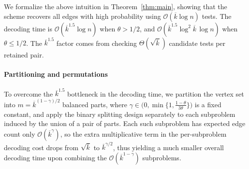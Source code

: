 \documentclass[journal]{IEEEtran}
\theoremstyle{definition}
\theoremstyle{definition}
\newcommand{\kb}{\overline{k}}
\newcommand{\bigO}{\mathcal{O}}
\begin{document}
We formalize the above intuition in Theorem~\ref{thm:main}, showing that the scheme recovers all edges with high probability using \(\bigO(\kb\log n)\) tests. The decoding time is \(\bigO(\kb^{1.5}\log n)\) when \(\theta>1/2\), and \(\bigO(\kb^{1.5}\log^{2}\kb\,\log n)\) when \(\theta\le 1/2\). The \(\kb^{1.5}\) factor comes from checking \(\Theta(\sqrt{\kb})\) candidate tests per retained pair.


\paragraph{Partitioning and permutations}
To overcome the \(\kb^{1.5}\) bottleneck in the decoding time, we partition the vertex set into
\(m=\kb^{(1-\gamma)/2}\) balanced parts, where \(\gamma \in \bigl(0,\min\{1,\frac{1-\theta}{3\theta}\}\bigr)\) is a fixed constant,
and apply the binary splitting design separately to each subproblem induced by the union of a pair of parts. Each such subproblem has expected edge count only
\(\bigO(\kb^\gamma)\), so the extra multiplicative term in the per-subproblem decoding cost drops from \(\sqrt{\kb}\) to \(\kb^{\gamma/2}\),
thus yielding a much smaller overall decoding time upon combining the \(\bigO(\kb^{1-\gamma})\) subproblems.
\end{document}
